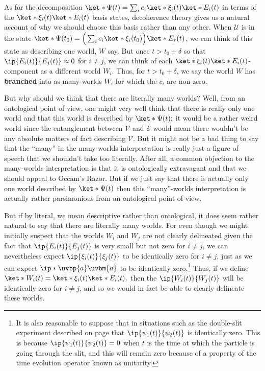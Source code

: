 \documentclass[12pt]{report}
\begin{document}
    As for the decomposition $\ket*{\Psi(t)}=\sum_i c_i \ket*{\xi_i(t)}\ket*{E_i(t)}$  in terms of the $\ket*{\xi_i(t)}\ket*{E_i(t)}$ basis states, decoherence theory gives us a natural account of why we should choose this basis rather than any other. When $\mathcal{U}$ is in the state $\ket*{\Psi(t_0)}=\Big(\sum_i c_i \ket*{\xi_i(t_0)}\Big)\ket*{E_r(t)}$, we can think of this state as describing one world, $W$ say.  %
%
    But once $t>t_0+\delta$ so that $\ip{E_i(t)}{E_j(t)}\approx 0$ for $i\neq j$, we can think of each $\ket*{\xi_i(t)}\ket*{E_i(t)}$-component as a different world $W_i$.   %
%
    Thus, for $t>t_0+\delta$, we say the world $W$ has \textbf{branched} into as many-worlds $W_i$ for which the $c_i$ are non-zero. 

    But why should we think that there are literally many worlds? Well, from an ontological point of view, one might very well think that there is really only one world and that this world is described by $\ket*{\Psi(t)};$ it would be a rather weird world since the entanglement between $\mathcal{V}$ and $\mathcal{E}$ would mean there wouldn't be any absolute matters of fact describing $\mathcal{V}$. But it might not be a bad thing to say that the ``many'' in the many-worlds interpretation is really just a figure of speech that we shouldn't take too literally. After all, a common objection to the many-worlds interpretation is that it is ontologically extravagant and that we should appeal to Occam's Razor. But if we just say that there is actually only one world described by $\ket*{\Psi(t)}$ then this ``many''-worlds interpretation is actually rather parsimonious from an ontological point of view. 

    But if by literal, we mean descriptive rather than ontological, it does seem rather natural to say that there are literally many worlds. For even though we might initially suspect that the worlds $W_i$ and $W_j$ are not clearly delineated given the fact that $\ip{E_i(t)}{E_j(t)}$ is very small but not zero for $i\neq j$, we can nevertheless expect $\ip{\xi_i(t)}{\xi_j(t)}$ to be identically zero for $i\neq j$, just as we can expect $\ip*{\uvbp{a}}{\uvbm{a}}$ to be identically zero.\footnote{It is also reasonable to suppose that in situations such as the double-slit experiment described on page \pageref{psi_slit} that $\ip{\psi_1(t)}{\psi_2(t)}$ is identically zero. This is because $\ip{\psi_1(t)}{\psi_2(t)}=0$ when $t$ is the time at which the particle is going through the slit, and this will remain zero because of a property of the time evolution operator known as unitarity.} Thus, if we define $\ket*{W_i(t)}=\ket*{\xi_i(t)}\ket*{E_i(t)},$ then the $\ip{W_i(t)}{W_j(t)}$ will be identically zero for $i\neq j$, and so we would in fact be able to clearly delineate these worlds.
\end{document}
